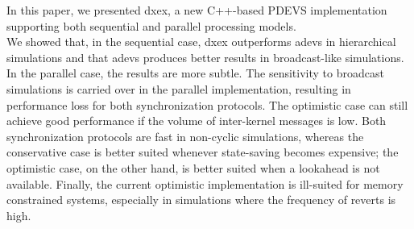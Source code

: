 In this paper, we presented dxex, a new C++-based PDEVS implementation supporting both sequential and parallel processing models.\\
We showed that, in the sequential case, dxex outperforms adevs in hierarchical simulations and that adevs produces better results in broadcast-like simulations.\\
In the parallel case, the results are more subtle. The sensitivity to broadcast simulations is carried over in the parallel implementation, resulting in performance loss for both synchronization protocols. The optimistic case can still achieve good performance if the volume of inter-kernel messages is low. Both synchronization protocols are fast in non-cyclic simulations, whereas the conservative case is better suited whenever state-saving becomes expensive; the optimistic case, on the other hand, is better suited when a lookahead is not available.
Finally, the current optimistic implementation is ill-suited for memory constrained systems, especially in simulations where the frequency of reverts is high.
